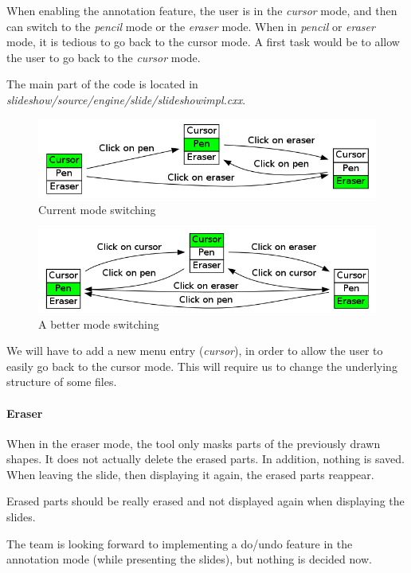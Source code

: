 \documentclass[a4paper,11pt]{article}
\begin{document}
When enabling the annotation feature, the user is in the \emph{cursor} mode, and then can switch to the \emph{pencil} mode or the \emph{eraser} mode. When in \emph{pencil} or \emph{eraser} mode, it is tedious to go back to the cursor mode. A first task would be to allow the user to go back to the \emph{cursor} mode.

The main part of the code is located in
\emph{slideshow/source/engine/slide/slideshowimpl.cxx}.

\begin{figure}[!h]
\centering
\includegraphics[scale=0.5]{images/modes_current.png}
\caption{Current mode switching}
\end{figure}

\begin{figure}[!h]
\centering
\includegraphics[scale=0.5]{images/modes.png}
\caption{A better mode switching}
\end{figure}

We will have to add a new menu entry (\emph{cursor}), in order to allow the user to easily go back to the cursor mode. This will require us to change the underlying structure of some files.

\paragraph*{Eraser}

When in the eraser mode, the tool only masks parts of the previously drawn shapes. It does not actually delete the erased parts. In addition, nothing is saved. When leaving the slide, then displaying it again, the erased parts reappear.

Erased parts should be really erased and not displayed again when displaying the slides.

The team is looking forward to implementing a do/undo feature in the annotation mode (while presenting the slides), but nothing is decided now.
\end{document}
